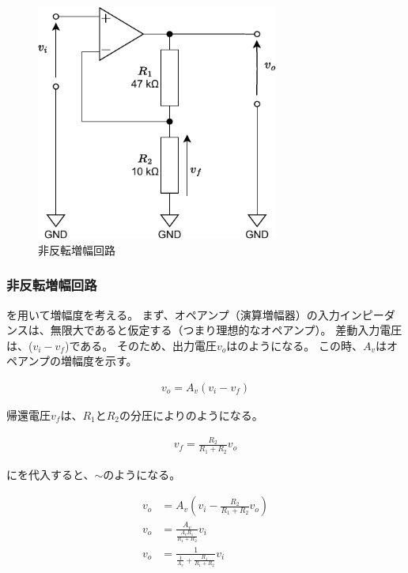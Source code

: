 \documentclass[report.tex]{subfiles}
\begin{document}
\begin{figure}[H]
	\centering
	\includegraphics[width=8cm]{fig/amp2.pdf}
	\caption{非反転増幅回路}
	\label{fig:amplifier-circuit2}
\end{figure}

\subsubsection{非反転増幅回路}

を用いて増幅度を考える。
まず、オペアンプ（演算増幅器）の入力インピーダンスは、無限大であると仮定する（つまり理想的なオペアンプ）。
差動入力電圧は、(\(v_i - v_f\))である。
そのため、出力電圧\(v_o\)はのようになる。
この時、\(A_v\)はオペアンプの増幅度を示す。

\begin{align}
	v_o = A_{v} (v_i - v_f) \label{eq:amp}
\end{align}

帰還電圧\(v_f\)は、\(R_1\)と\(R_2\)の分圧によりのようになる。

\begin{align}
	v_f = \frac{R_2}{R_1 + R_2} v_o \label{eq:amp2}
\end{align}

にを代入すると、\(\sim\)のようになる。

\begin{align}
	v_o & = A_v \left( v_i - \frac{R_2}{R_1 + R_2} v_o \right) \label{eq:amp3}               \\
	v_o & = \frac{A_v}{\frac{A_v R_1}{R_1 + R_2}} v_i                                        \\
	v_o & = \frac{1}{\frac{1}{A_v} + \frac{R_1}{R_1 + R_2}} v_i              \label{eq:amp4}
\end{align}
\end{document}
